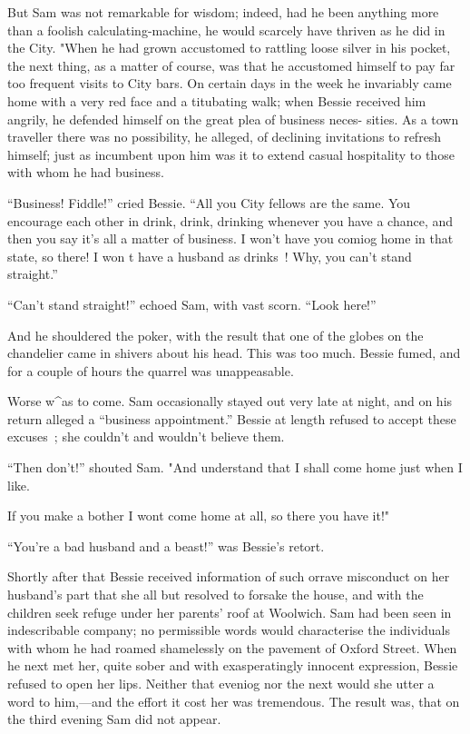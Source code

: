 But Sam was not remarkable for wisdom; indeed, had he been anything more
than a foolish calculating-machine, he would scarcely have thriven as he
did in the City. "When he had grown accustomed to rattling loose silver
in his pocket, the next thing, as a matter of course, was that he
accustomed himself to pay far too frequent visits to City bars. On
certain days in the week he invariably came home with a very red face
and a titubating walk; when Bessie received him angrily, he defended
himself on the great plea of business neces- {} sities. As a town
traveller there was no possibility, he alleged, of declining invitations
to refresh himself; just as incumbent upon him was it to extend casual
hospitality to those with whom he had business.

``Business! Fiddle!'' cried Bessie. ``All you City fellows are the same.
You encourage each other in drink, drink, drinking whenever you have a
chance, and then you say it's all a matter of business. I won't have you
comiog home in that state, so there! I won t have a husband as drinks~!
Why, you can't stand straight.''

``Can't stand straight!'' echoed Sam, with vast scorn. ``Look here!''

And he shouldered the poker, with the result that one of the globes on
the chandelier came in shivers about his head. This was too much. Bessie
fumed, and for a couple of hours the quarrel was unappeasable.

Worse w\^{}as to come. Sam occasionally stayed out very late at night,
and on his return alleged a ``business appointment.'' Bessie at length
refused to accept these excuses~; she couldn't and wouldn't believe
them.

``Then don't!'' shouted Sam. "And understand that I shall come home just
when I like.

{} If you make a bother I wont come home at all, so there you have it!"

``You're a bad husband and a beast!'' was Bessie's retort.

Shortly after that Bessie received information of such orrave misconduct
on her husband's part that she all but resolved to forsake the house,
and with the children seek refuge under her parents' roof at Woolwich.
Sam had been seen in indescribable company; no permissible words would
characterise the individuals with whom he had roamed shamelessly on the
pavement of Oxford Street. When he next met her, quite sober and with
exasperatingly innocent expression, Bessie refused to open her lips.
Neither that eveniog nor the next would she utter a word to him,---and
the effort it cost her was tremendous. The result was, that on the third
evening Sam did not appear.

